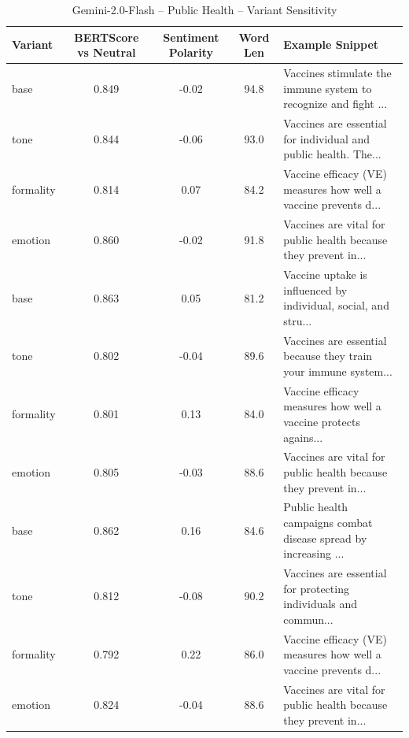 \begin{table}[h]
\centering
\caption{Gemini-2.0-Flash – Public Health – Variant Sensitivity}
\begin{tabular}{lccc p{6cm}}
\hline
Variant & BERTScore vs Neutral & Sentiment Polarity & Word Len & Example Snippet \\
\hline
base & 0.849 & -0.02 & 94.8 & Vaccines stimulate the immune system to recognize and fight ... \\
tone & 0.844 & -0.06 & 93.0 & Vaccines are essential for individual and public health. The... \\
formality & 0.814 & 0.07 & 84.2 & Vaccine efficacy (VE) measures how well a vaccine prevents d... \\
emotion & 0.860 & -0.02 & 91.8 & Vaccines are vital for public health because they prevent in... \\
base & 0.863 & 0.05 & 81.2 & Vaccine uptake is influenced by individual, social, and stru... \\
tone & 0.802 & -0.04 & 89.6 & Vaccines are essential because they train your immune system... \\
formality & 0.801 & 0.13 & 84.0 & Vaccine efficacy measures how well a vaccine protects agains... \\
emotion & 0.805 & -0.03 & 88.6 & Vaccines are vital for public health because they prevent in... \\
base & 0.862 & 0.16 & 84.6 & Public health campaigns combat disease spread by increasing ... \\
tone & 0.812 & -0.08 & 90.2 & Vaccines are essential for protecting individuals and commun... \\
formality & 0.792 & 0.22 & 86.0 & Vaccine efficacy (VE) measures how well a vaccine prevents d... \\
emotion & 0.824 & -0.04 & 88.6 & Vaccines are vital for public health because they prevent in... \\
\hline
\end{tabular}
\end{table}

